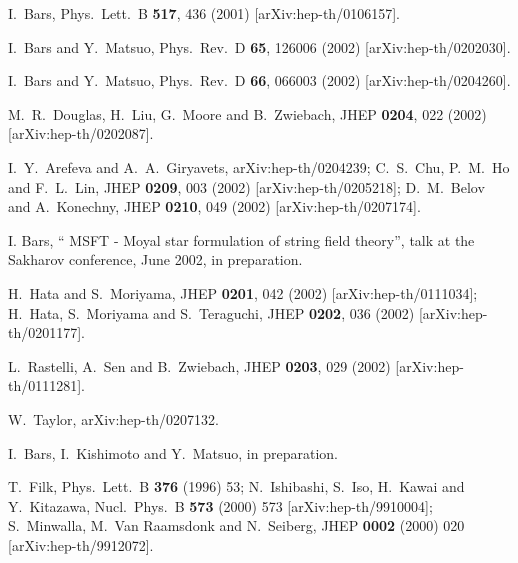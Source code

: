 \documentclass[a4paper,11pt]{article}
\begin{document}
\begin{thebibliography}{99}
 {\small I.~Bars, %
Phys.\ Lett.\ B \textbf{517}, 436 (2001) [arXiv:hep-th/0106157].
}

 {\small I.~Bars and Y.~Matsuo,
Phys.\ Rev.\ D \textbf{65}, 126006 (2002) [arXiv:hep-th/0202030].
}

 {\small I.~Bars and Y.~Matsuo,
Phys.\ Rev.\ D \textbf{66}, 066003 (2002) [arXiv:hep-th/0204260].
}

{\small %
}

 {\small M.~R.~Douglas, H.~Liu, G.~Moore and B.~Zwiebach,
JHEP \textbf{0204}, 022 (2002) [arXiv:hep-th/0202087]. }

 {\small %
I.~Y.~Arefeva and A.~A.~Giryavets,
arXiv:hep-th/0204239;\newline
%
%
C.~S.~Chu, P.~M.~Ho and F.~L.~Lin,
JHEP \textbf{0209}, 003 (2002) [arXiv:hep-th/0205218];\newline
%
%
D.~M.~Belov and A.~Konechny,
JHEP \textbf{0210}, 049 (2002) [arXiv:hep-th/0207174].
}

 {\small I. Bars, `` MSFT - Moyal star formulation of
string field theory'', talk at the Sakharov conference, June 2002, in
preparation. }

 {\small %
H.~Hata and S.~Moriyama,
JHEP \textbf{0201}, 042 (2002) [arXiv:hep-th/0111034];\newline
H.~Hata, S.~Moriyama and S.~Teraguchi, %
JHEP \textbf{0202}, 036 (2002) [arXiv:hep-th/0201177].
}

 {\small %
L.~Rastelli, A.~Sen and B.~Zwiebach, %
JHEP \textbf{0203}, 029 (2002) [arXiv:hep-th/0111281].
}

 {\small W.~Taylor,
arXiv:hep-th/0207132. %
}


 {\small
I.~Bars, I.~Kishimoto and Y.~Matsuo, in preparation.
}


{\small T.~Filk, %
Phys.\ Lett.\ B \textbf{376} (1996) 53;\newline
N.~Ishibashi, S.~Iso, H.~Kawai and Y.~Kitazawa,
Nucl.\ Phys.\ B \textbf{573} (2000) 573 [arXiv:hep-th/9910004];\newline
S.~Minwalla, M.~Van Raamsdonk and N.~Seiberg,
JHEP \textbf{0002} (2000) 020 [arXiv:hep-th/9912072]. }


\end{thebibliography}
\end{document}
